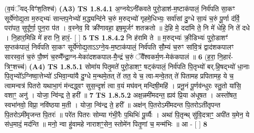 \documentclass[17pt]{extarticle}
\begin{document}
                  \newline
                      (व॒यंॅयद्-विꣳ॑श॒तिश्च॑)  \textbf{(A3)} \newline \newline
                                        \textbf{ TS 1.8.4.1} \newline
                  अ॒ग्नयेऽनी॑कवते पुरो॒डाश॑-म॒ष्टाक॑पालं॒ निर्व॑पति सा॒कꣳ सूर्ये॑णोद्य॒ता म॒रुद्भ्यः॑ सान्तप॒नेभ्यो॑ म॒द्ध्यन्दि॑ने च॒रुं म॒रुद्भ्यो॑ गृहमे॒धिभ्यः॒ सर्वा॑सां दु॒ग्धे सा॒यं च॒रुं पू॒र्णा द॑र्वि॒ परा॑पत॒ सुपू᳚र्णा॒ पुन॒रा प॑त । व॒स्नेव॒ वि क्री॑णावहा॒ इष॒मूर्जꣳ॑ शतक्रतो ॥ दे॒हि मे॒ ददा॑मि ते॒ नि मे॑ धेहि॒ नि ते॑ दधे । नि॒हार॒मिन्नि मे॑ हरा नि॒ हारं॒- [ ] \textbf{  5} \newline
                  \newline
                                \textbf{ TS 1.8.4.2} \newline
                  नि ह॑रामि ते ॥ म॒रुद्भ्यः॑ क्री॒डिभ्यः॑ पुरो॒डाशꣳ॑ स॒प्तक॑पालं॒ निर्व॑पति सा॒कꣳ सूर्ये॑णोद्य॒ताऽऽग्ने॒य-म॒ष्टाक॑पालं॒ निर्व॑पति सौ॒म्यं च॒रुꣳ सा॑वि॒त्रं द्वाद॑शकपालꣳ सारस्व॒तं च॒रुं पौ॒ष्णं च॒रुमै᳚न्द्रा॒ग्न-मेका॑दशकपाल-मै॒न्द्रं च॒रुं ॅवै᳚श्वकर्म॒ण-मेक॑कपालं ॥ \textbf{  6 } \newline
                  \newline
                      (ह॒रा॒ नि॒हारं॑-त्रिꣳ॒॒शच्च॑)  \textbf{(A4)} \newline \newline
                                        \textbf{ TS 1.8.5.1} \newline
                  सोमा॑य पितृ॒मते॑ पुरो॒डाशꣳ॒॒ षट्क॑पालं॒ निर्व॑पति पि॒तृभ्यो॑ बर्.हि॒षद्भ्यो॑ धा॒नाः पि॒तृभ्यो᳚ऽग्निष्वा॒त्तेभ्यो॑ ऽभिवा॒न्या॑यै दु॒ग्धे म॒न्थमे॒तत् ते॑ तत॒ ये च॒ त्वा-मन्वे॒तत् ते॑ पितामह प्रपितामह॒ ये च॒ त्वामन्वत्र॑ पितरो यथाभा॒गं म॑न्दद्ध्वꣳ सुस॒न्दृशं॑ त्वा व॒यं मघ॑वन् मन्दिषी॒महि॑ । प्रनू॒नं पू॒र्णव॑न्धुरः स्तु॒तो या॑सि॒ वशाꣳ॒॒ अनु॑ । योजा॒ न्वि॑न्द्र ते॒ हरी᳚ ॥ \textbf{  7} \newline
                  \newline
                                \textbf{ TS 1.8.5.2} \newline
                  अक्ष॒न्नमी॑मदन्त॒ ह्यव॑ प्रि॒या अ॑धूषत । अस्तो॑षत॒ स्वभा॑नवो॒ विप्रा॒ नवि॑ष्ठया म॒ती । योजा॒ न्वि॑न्द्र ते॒ हरी᳚ ॥ अक्ष॑न् पि॒तरोऽमी॑मदन्त पि॒तरोऽती॑तृपन्त पि॒तरोऽमी॑मृजन्त पि॒तरः॑ ॥ परे॑त पितरः सोम्या गंभी॒रैः प॒थिभिः॑ पू॒र्व्यैः । अथा॑ पि॒तृन्थ् सु॑वि॒दत्राꣳ॒॒ अपी॑त य॒मेन॒ ये स॑ध॒मादं॒ मद॑न्ति ॥ मनो॒ न्वा हु॑वामहे नाराशꣳ॒॒सेन॒ स्तोमे॑न पितृ॒णां च॒ मन्म॑भिः ॥ आ - [ ] \textbf{  8} \newline
\end{document}
